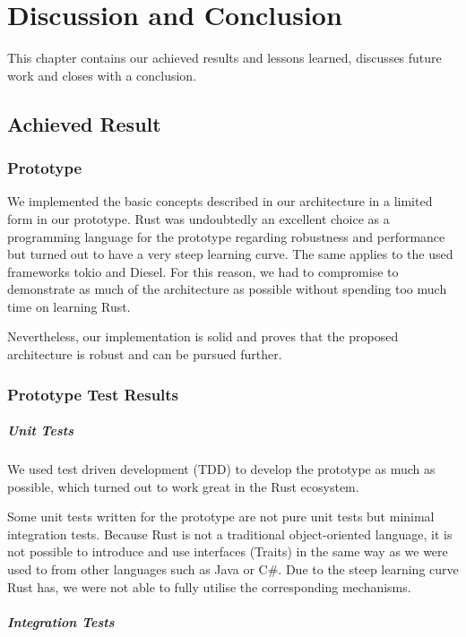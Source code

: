 \chapter{Discussion and Conclusion}
\label{sec:discussion-and-conclusion}
This chapter contains our achieved results and lessons learned, discusses future work and closes with a conclusion.

\section{Achieved Result}

\subsection{Prototype}

We implemented the basic concepts described in our architecture in a limited form in our prototype. Rust was undoubtedly an excellent choice as a programming language for the prototype regarding robustness and performance but turned out to have a very steep learning curve. The same applies to the used frameworks tokio and Diesel. For this reason, we had to compromise to demonstrate as much of the architecture as possible without spending too much time on learning Rust.

Nevertheless, our implementation is solid and proves that the proposed architecture is robust and can be pursued further.

\subsection{Prototype Test Results}

\paragraph{Unit Tests}
We used test driven development (TDD) to develop the prototype as much as possible, which turned out to work great in the Rust ecosystem.

Some unit tests written for the prototype are not pure unit tests but minimal integration tests. Because Rust is not a traditional object-oriented language, it is not possible to introduce and use interfaces (Traits) in the same way as we were used to from other languages such as Java or C\#. Due to the steep learning curve Rust has, we were not able to fully utilise the corresponding mechanisms.

\paragraph{Integration Tests}


